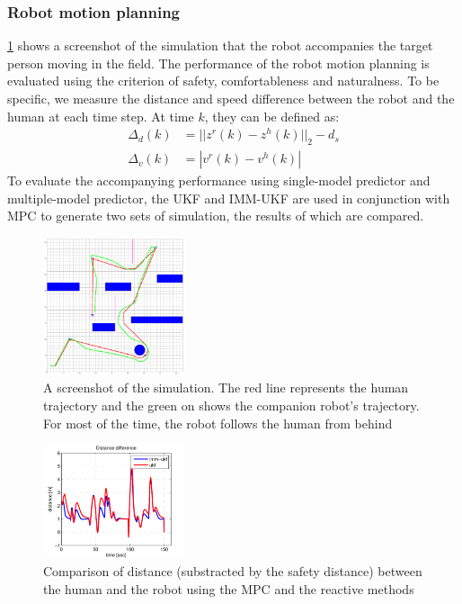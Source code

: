 \documentclass[letterpaper, 10 pt, conference]{ieeeconf}
\begin{document}
	\subsubsection{Robot motion planning}\label{subsubsec:motion_plan}
	\cref{fig:robot_accom} shows a screenshot of the simulation that the robot accompanies the target person moving in the field.
	The performance of the robot motion planning is evaluated using the criterion of safety, comfortableness and naturalness.
	To be specific, we measure the distance and speed difference between the robot and the human at each time step.
	At time $k$, they can be defined as:
	\begin{subequations}
		\begin{align}
			\Delta_d(k)&=||z^r(k)-z^h(k)||_2-d_s\label{eqn:err_d}\\
			\Delta_v(k)&=|v^r(k)-v^h(k)|\label{eqn:err_v}
		\end{align}
	\end{subequations}
	To evaluate the accompanying performance using single-model predictor and multiple-model predictor, the UKF and IMM-UKF are used in conjunction with MPC to generate two sets of simulation, the results of which are compared.
	\begin{figure}
		\centering
		\includegraphics[width=0.37\textwidth]{figures/r_accomp.pdf}
		\caption{A screenshot of the simulation. The red line represents the human trajectory and the green on shows the companion robot's trajectory. For most of the time, the robot follows the human from behind}
		\label{fig:robot_accom}
	\end{figure}
	\begin{figure}
		\centering
		\includegraphics[width=0.37\textwidth]{figures/dis_diff.pdf}
		\caption{Comparison of distance (substracted by the safety distance) between the human and the robot using the MPC and the reactive methods}
		\label{fig:err_d}
	\end{figure}
	
\end{document}
